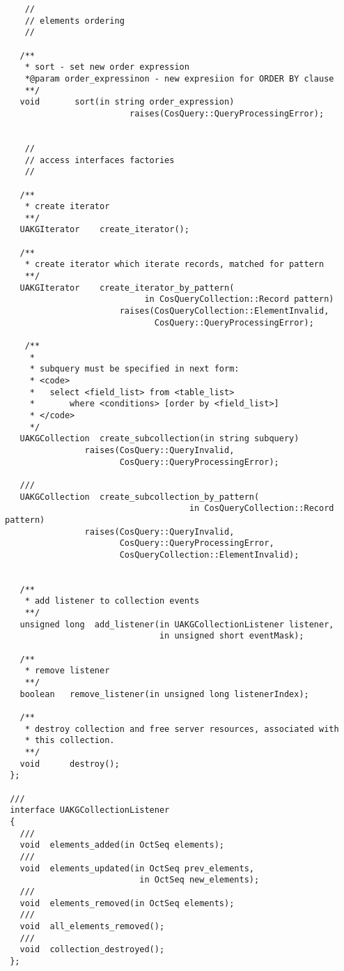 \documentclass[10pt]{article}
\begin{document}
\begin{verbatim}
    //
    // elements ordering
    //

   /**
    * sort - set new order expression
    *@param order_expressinon - new expresiion for ORDER BY clause
    **/
   void       sort(in string order_expression)
                         raises(CosQuery::QueryProcessingError);


    //
    // access interfaces factories
    //
                              
   /**
    * create iterator
    **/ 
   UAKGIterator    create_iterator();

   /**
    * create iterator which iterate records, matched for pattern
    **/
   UAKGIterator    create_iterator_by_pattern(
                            in CosQueryCollection::Record pattern)
                       raises(CosQueryCollection::ElementInvalid,
                              CosQuery::QueryProcessingError);

    /**
     *
     * subquery must be specified in next form:
     * <code>
     *   select <field_list> from <table_list> 
     *       where <conditions> [order by <field_list>]
     * </code>
     */
   UAKGCollection  create_subcollection(in string subquery)
                raises(CosQuery::QueryInvalid, 
                       CosQuery::QueryProcessingError);

   ///
   UAKGCollection  create_subcollection_by_pattern(
                                     in CosQueryCollection::Record pattern)
                raises(CosQuery::QueryInvalid, 
                       CosQuery::QueryProcessingError,
                       CosQueryCollection::ElementInvalid);


   /**
    * add listener to collection events
    **/
   unsigned long  add_listener(in UAKGCollectionListener listener,
                               in unsigned short eventMask);

   /**
    * remove listener
    **/
   boolean   remove_listener(in unsigned long listenerIndex);

   /**
    * destroy collection and free server resources, associated with
    * this collection.
    **/
   void      destroy();
 };

 ///
 interface UAKGCollectionListener
 {
   ///
   void  elements_added(in OctSeq elements);
   ///
   void  elements_updated(in OctSeq prev_elements, 
                           in OctSeq new_elements);
   ///
   void  elements_removed(in OctSeq elements);
   ///
   void  all_elements_removed();
   ///
   void  collection_destroyed();
 };


\end{verbatim}
\end{document}
